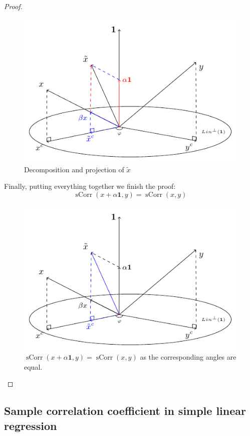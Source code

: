 \documentclass[nobib]{tufte-handout}
\DeclareMathOperator{\sCorr}{sCorr}
\theoremstyle{definition}
\begin{document}
\begin{proof}
\begin{figure}
  \centering
  \includegraphics{images/corr_const_br_up.pdf}
  \caption{Decomposition and projection of $\tilde x$}
  \label{fig:corr_tildex}
\end{figure}

Finally, putting everything together we finish the proof:
\[
\sCorr(x + \alpha \mathbf{1}, y) = \sCorr(x,y)
\]

\begin{figure}
  \centering
  \includegraphics{images/corr_const_final.pdf}
  \caption{$\sCorr(x + \alpha \mathbf{1}, y) = \sCorr(x,y)$ as the corresponding angles are equal.}
  \label{fig:corr_final}
\end{figure}


\end{proof}

\subsection{Sample correlation coefficient in simple linear regression}
\end{document}
